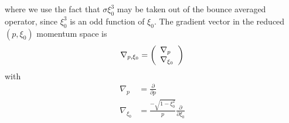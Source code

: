 where we use the fact that $\sigma\xi_{0}^{3}$ may be taken out of the bounce
averaged operator, since $\xi_{0}^{3}$ is an odd function of $\xi_{0}.$ The
gradient vector in the reduced $\left(  p,\xi_{0}\right)  $ momentum space is
\begin{equation}
\nabla_{p,\xi_{0}}=\left(
\begin{array}
[c]{l}%
\nabla_{p}\\
\nabla_{\xi_{0}}%
\end{array}
\right)
\end{equation}
with
\begin{align}
\nabla_{p} &  =\frac{\partial}{\partial p}\\
\nabla_{\xi_{0}} &  =\frac{-\sqrt{1-\xi_{0}^{2}}}{p}\frac{\partial}%
{\partial\xi_{0}}%
\end{align}
